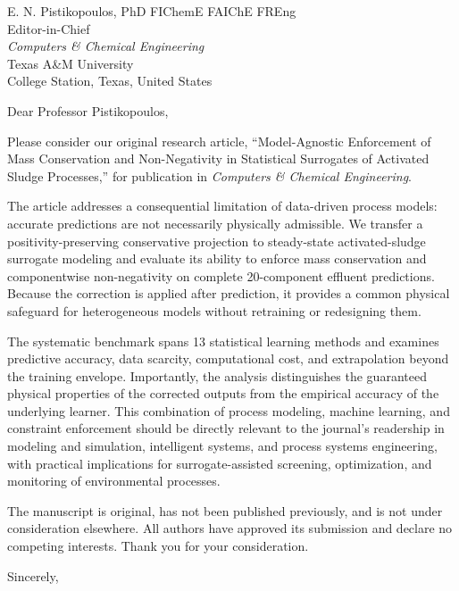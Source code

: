 \documentclass[11pt]{letter}
\date{\today}
\begin{document}
\begin{letter}{E. N. Pistikopoulos, PhD FIChemE FAIChE FREng\\
Editor-in-Chief\\
\textit{Computers \& Chemical Engineering}\\
Texas A\&M University\\
College Station, Texas, United States}

\opening{Dear Professor Pistikopoulos,}

Please consider our original research article, ``Model-Agnostic Enforcement of Mass Conservation and Non-Negativity in Statistical Surrogates of Activated Sludge Processes,'' for publication in \textit{Computers \& Chemical Engineering}.

The article addresses a consequential limitation of data-driven process models: accurate predictions are not necessarily physically admissible. We transfer a positivity-preserving conservative projection to steady-state activated-sludge surrogate modeling and evaluate its ability to enforce mass conservation and componentwise non-negativity on complete 20-component effluent predictions. Because the correction is applied after prediction, it provides a common physical safeguard for heterogeneous models without retraining or redesigning them.

The systematic benchmark spans 13 statistical learning methods and examines predictive accuracy, data scarcity, computational cost, and extrapolation beyond the training envelope. Importantly, the analysis distinguishes the guaranteed physical properties of the corrected outputs from the empirical accuracy of the underlying learner. This combination of process modeling, machine learning, and constraint enforcement should be directly relevant to the journal's readership in modeling and simulation, intelligent systems, and process systems engineering, with practical implications for surrogate-assisted screening, optimization, and monitoring of environmental processes.

The manuscript is original, has not been published previously, and is not under consideration elsewhere. All authors have approved its submission and declare no competing interests. Thank you for your consideration.

\closing{Sincerely,}

\end{letter}
\end{document}
